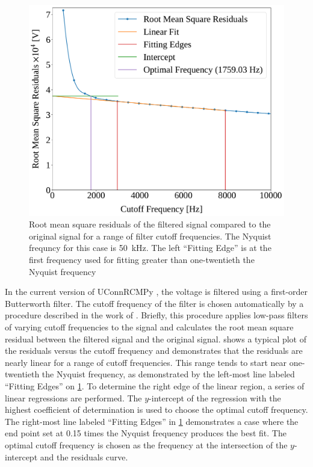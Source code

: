 \documentclass[12pt]{../ussci}
\begin{document}
\begin{figure}[htbp]
\begin{minipage}[t]{0.48\textwidth}
        \includegraphics[width=\linewidth]{figures/residuals.pdf}
        \caption{Root mean square residuals of the filtered signal compared to
        the original signal for a range of filter cutoff frequencies. The
        Nyquist frequncy for this case is \SI{50}{\kHz}. The left ``Fitting
        Edge'' is at the first frequency used for fitting greater than
        one-twentieth the Nyquist frequency}
        \label{fig:residuals}
    \end{minipage}
\end{figure}

In the current version of UConnRCMPy \autocite{uconnrcmpy}, the voltage is
filtered using a first-order Butterworth filter. The cutoff frequency of the
filter is chosen automatically by a procedure described in the work of
\textcite{Yu1999,Duarte2014}. Briefly, this procedure applies low-pass filters
of varying cutoff frequencies to the signal and calculates the root mean square
residual between the filtered signal and the original signal.
 shows a typical plot of the residuals versus the cutoff
frequency and demonstrates that the residuals are nearly linear for a range of
cutoff frequencies. This range tends to start near one-twentieth the Nyquist
frequency, as demonstrated by the left-most line labeled ``Fitting Edges'' on
\cref{fig:residuals}. To determine the right edge of the linear region, a series
of linear regressions are performed. The $y$-intercept of the regression
with the highest coefficient of determination is used to choose the optimal
cutoff frequency. The right-most line labeled ``Fitting Edges'' in
\cref{fig:residuals} demonstrates a case where the end point set at \num{0.15}
times the Nyquist frequency produces the best fit. The optimal cutoff frequency
is chosen as the frequency at the intersection of the $y$-intercept and the
residuals curve.
\end{document}
